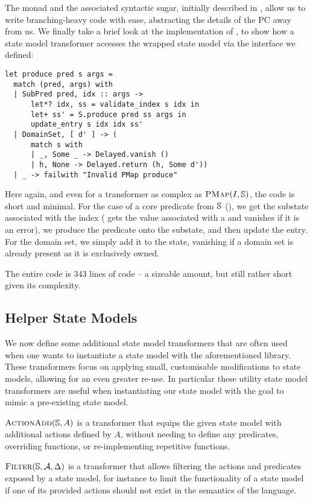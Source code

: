 The  monad and the associated syntactic sugar, initially described in \cite{sacha-phd}, allow us to write branching-heavy code with ease, abstracting the details of the PC away from us. We finally take a brief look at the implementation of \produce, to show how a state model transformer accesses the wrapped state model via the interface we defined: \begin{lstlisting}
let produce pred s args =
  match (pred, args) with
  | SubPred pred, idx :: args ->
      let*? idx, ss = validate_index s idx in
      let+ ss' = S.produce pred ss args in
      update_entry s idx idx ss'
  | DomainSet, [ d' ] -> (
      match s with
      | _, Some _ -> Delayed.vanish ()
      | h, None -> Delayed.return (h, Some d'))
  | _ -> failwith "Invalid PMap produce"
\end{lstlisting}
Here again, and even for a transformer as complex as $\textsc{PMap}(I,\mathbb S)$, the code is short and minimal. For the case of a core predicate from $\mathbb S$ (), we get the substate associated with the index ( gets the value associated with a  and vanishes if it is an error), we produce the predicate onto the substate, and then update the entry. For the domain set, we simply add it to the state, vanishing if a domain set is already present as it is exclusively owned.

The entire \PMap{} code is 343 lines of code -- a sizeable amount, but still rather short given its complexity.

\subsection{Helper State Models}

We now define some additional state model transformers that are often used when one wants to instantiate a state model with the aforementioned library. These transformers focus on applying small, customisable modifications to state models, allowing for an even greater re-use. In particular these utility state model transformers are useful when instantiating our state model with the goal to mimic a pre-existing state model.

$\textsc{ActionAdd}(\mathbb S, A)$ is a transformer that equips the given state model with additional actions defined by $A$, without needing to define any predicates, overriding functions, or re-implementing repetitive functions.

$\textsc{Filter}(\mathbb S, {\cal{A}}, \Delta)$ is a transformer that allows filtering the actions and predicates exposed by a state model, for instance to limit the functionality of a state model if one of its provided actions should not exist in the semantics of the language.

